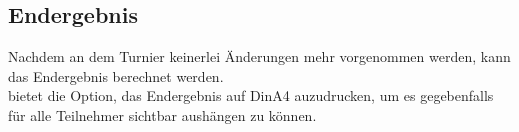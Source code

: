 \subsection{Endergebnis}

\noindent
Nachdem an dem Turnier keinerlei Änderungen mehr vorgenommen werden, kann das
Endergebnis berechnet werden.\\[.1cm]
\bb bietet die Option, das Endergebnis auf DinA4 auzudrucken, um es gegebenfalls
für alle Teilnehmer sichtbar aushängen zu können.
